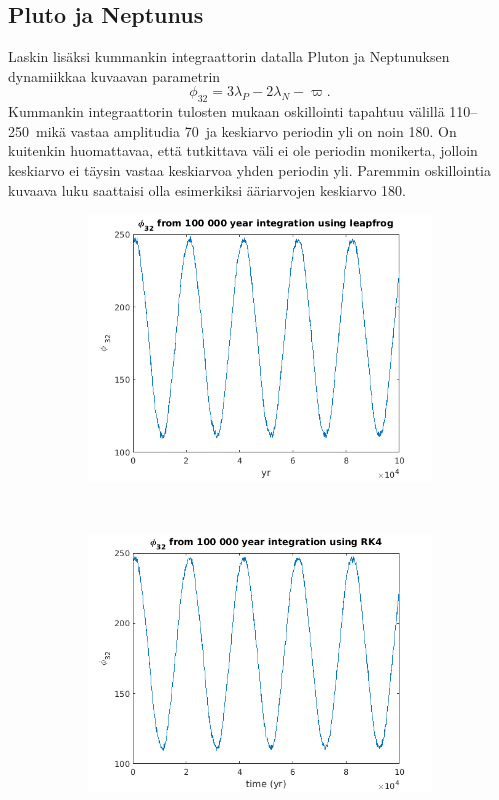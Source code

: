 \documentclass[12pt,a4paper,titlepage]{article}
\begin{document}
\subsection{Pluto ja Neptunus}
Laskin lisäksi kummankin integraattorin datalla Pluton ja Neptunuksen dynamiikkaa kuvaavan parametrin
$$\phi_{32} = 3\lambda_P-2\lambda_N-\varpi.$$ Kummankin integraattorin tulosten mukaan oskillointi tapahtuu välillä 110--250\textdegree\ mikä vastaa amplitudia 70\textdegree\ ja keskiarvo periodin yli on noin 180\textdegree . On kuitenkin huomattavaa, että tutkittava väli ei ole periodin monikerta, jolloin keskiarvo ei täysin vastaa keskiarvoa yhden periodin yli. Paremmin oskillointia kuvaava luku saattaisi olla esimerkiksi ääriarvojen keskiarvo 180.

\begin{figure}[h!]
    \centering
    \begin{subfigure}[b]{0.8\textwidth}
        \includegraphics[width=\textwidth]{../plots/lf-shortrun-phi32.png}
    \end{subfigure}
    \\
    \begin{subfigure}[b]{0.8\textwidth}
        \includegraphics[width=\textwidth]{../plots/rk-shortrun-phi32.png}

\end{subfigure}
\end{figure}
\end{document}
